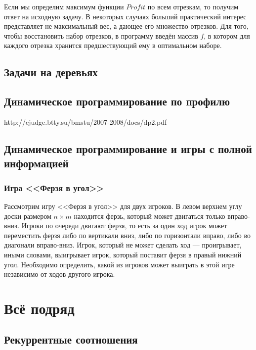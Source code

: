 \documentclass[14pt,openany]{book}
\begin{document}
Если мы определим максимум функции $Profit$ по всем отрезкам, то получим ответ на исходную задачу.
В некоторых случаях больший практический интерес представляет не максимальный вес, а дающее его
множество отрезков. Для того, чтобы восстановить набор отрезков, в программу введён массив $f$,
в котором для каждого отрезка хранится предшествующий ему в оптимальном наборе.





\chapter{Задачи на деревьях}

\chapter{Динамическое программирование по профилю}

http://ejudge.btty.su/bmstu/2007-2008/docs/dp2.pdf

\chapter{Динамическое программирование и игры с полной информацией}

\section{Игра <<Ферзя в угол>>}

Рассмотрим игру <<Ферзя в угол>> для двух игроков. В левом верхнем углу доски размером $n \times m$ 
находится ферзь, который может двигаться только вправо-вниз. Игроки по очереди двигают ферзя, то есть 
за один ход игрок может переместить ферзя либо по вертикали вниз, либо по горизонтали вправо, либо во 
диагонали вправо-вниз. Игрок, который не может сделать ход — проигрывает, иными словами, выигрывает 
игрок, который поставит ферзя в правый нижний угол. Необходимо определить, какой из игроков может 
выиграть в этой игре независимо от ходов другого игрока.

\part{Всё подряд}

\chapter{Рекуррентные соотношения}
\end{document}
